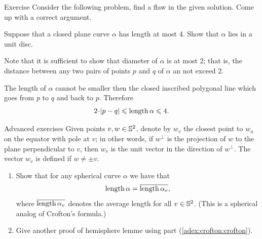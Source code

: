\begin{thm}{Exercise}\label{ex:flaw}
Consider the following problem, find a flaw in the given solution.
Come up with a correct argument.
\end{thm}

 
Suppose that a closed plane curve $\alpha$ has length at most 4.
Show that $\alpha$ lies in a unit disc.

Note that it is sufficient to show that diameter of $\alpha$ is at most 2;
that is, the distance between any two pairs of points $p$ and $q$ of $\alpha$ an not exceed $2$.

The length of $\alpha$ cannot be smaller then the closed inscribed polygonal line which goes from $p$ to $q$ and back to $p$.
Therefore 
\[2\cdot |p-q|\le\length \alpha\le 4.\]
\qedsf

\begin{thm}{Advanced exercises} \label{adex:crofton}
Given points $v,w\in\mathbb{S}^2$, denote by $w_v$ the closest point to $w_u$ on the equator with pole at $v$;
in other words, if $w^\perp$ is the projection of $w$ to the plane perpendicular to $v$, then $w_v$ is the unit vector in the direction of $w^\perp$.
The vector $w_v$ is defined if $w\ne\pm v$.

\begin{enumerate}
\item \label{adex:crofton:crofton}
Show that for any spherical curve $\alpha$ we have that
\[\mathop{\rm length}\nolimits\alpha=\overline{\mathop{\rm length}\nolimits\alpha_v},\]
where $\overline{\mathop{\rm length}\nolimits\alpha_v}$ denotes the average length for all $v\in \mathbb{S}^2$.
(This is a spherical analog of Crofton's formula.)
\item\label{adex:crofton:hemisphere} Give another proof of hemisphere lemme using part (\ref{adex:crofton:crofton}). 
\end{enumerate}
 
\end{thm}

